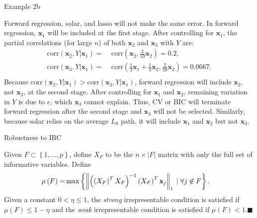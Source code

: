 \documentclass{beamer}
\begin{document}
\begin{frame}{Example 2b}

  Forward regression, solar, and lasso will not make the same error. In forward regression, $\mathbf{x}_1$ will be included at the first stage. After controlling for $\mathbf{x}_1$, the partial correlations (for large $n$) of both $\mathbf{x}_2$ and $\mathbf{x}_3$ with $Y$ are:
  \begin{equation}
    \begin{aligned}
      \mathrm{corr} \left( \mathbf{x}_2, Y \vert \mathbf{x}_1 \right)  = & \;\mathrm{corr} \left( \mathbf{x}_2, \frac{2}{10} \mathbf{x}_2 \right)
      = 0.2, \\
      \mathrm{corr} \left( \mathbf{x}_3, Y \vert \mathbf{x}_1 \right)  = & \;\mathrm{corr} \left( \frac{1}{3} \mathbf{x}_1 + \frac{1}{3} \mathbf{x}_2, \frac{2}{10} \mathbf{x}_2 \right)
      = 0.0667. \\
    \end{aligned}
  \end{equation}
  Because $\mathrm{corr}(\mathbf{x}_2, Y \vert \mathbf{x}_1)>\mathrm{corr}(\mathbf{x}_3, Y \vert \mathbf{x}_1)$, forward regression will include $\mathbf{x}_2$, not $\mathbf{x}_3$, at the second stage. After controlling for $\mathbf{x}_1$ and $\mathbf{x}_2$, remaining variation in $Y$ is due to $e$, which $\mathbf{x}_3$ cannot explain. Thus, CV or BIC will terminate forward regression after the second stage and $\mathbf{x}_3$ will not be selected. Similarly, because solar relies on the average $L_0$ path, it will include $\mathbf{x}_1$ and $\mathbf{x}_2$ but not $\mathbf{x}_3$.

\end{frame}

\begin{frame}{Robustness to IRC}

  \begin{definition}[IRC]
    Given $F \subset \left\{ 1, \ldots, p \right\}$, define $X_F$ to be the $n \times \left\vert F \right \vert$ matrix with only the full set of informative variables. Define
      \begin{align}
      \mu \left( F \right) = & \max \left\{ \left\Vert \left( \left( X_F \right)^T X_F \right)^{-1} \left( X_F \right)^T \mathbf{x}_j \right\Vert_1 \; \vert \; \forall j \not\in F \right\}. \notag
      \end{align}
    Given a constant $0 < \eta \leqslant 1$, the \emph{strong} irrepresentable condition is satisfied if $\mu \left( F \right) \leqslant 1 - \eta$ and the \emph{weak} irrepresentable condition is satisfied if $\mu \left( F \right) < 1$.$\blacksquare$
  \end{definition}
\end{frame}
\end{document}
